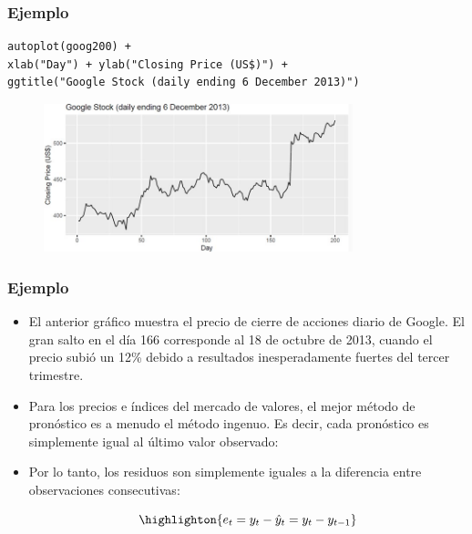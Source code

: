 \documentclass[10pt]{beamer}
\begin{document}





\begin{frame}[fragile]
\frametitle{Ejemplo}


\begin{lstlisting}
autoplot(goog200) +
xlab("Day") + ylab("Closing Price (US$)") +
ggtitle("Google Stock (daily ending 6 December 2013)")
\end{lstlisting}

\pause


\begin{figure}
\begin{center}
    \includegraphics[width=0.8\textwidth]{Imagen11.JPG}
\end{center}
\end{figure}


\end{frame}




\begin{frame}[fragile]
\frametitle{Ejemplo}


\begin{itemize}
\item El anterior gráfico muestra el precio de cierre de acciones diario de Google. El gran salto en el día 166 corresponde al 18 de octubre de 2013, cuando el precio subió un 12\% debido a resultados inesperadamente fuertes del tercer trimestre.

\vspace{3mm}

\item Para los precios e índices del mercado de valores, el mejor método de pronóstico es a menudo el método ingenuo. Es decir, cada pronóstico es simplemente igual al último valor observado: 

\vspace{3mm}

\item Por lo tanto, los residuos son simplemente iguales a la diferencia entre observaciones consecutivas:

\begin{equation}
\highlighton{e_t = y_t - \hat{y}_t = y_t - y_{t-1}}
\end{equation}


\end{itemize}

\end{frame}
\end{document}
